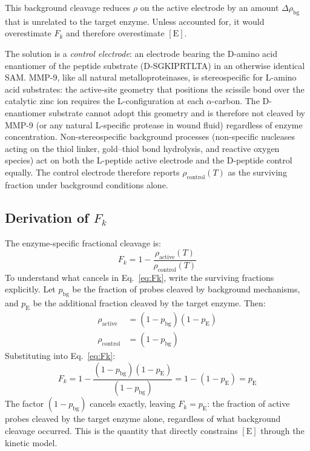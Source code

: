 \documentclass[10pt,a4paper]{article}
\numberwithin{equation}{section}
\newcommand{\Fk}{F_k}
\begin{document}
This background cleavage reduces $\rho$ on the active electrode by an
amount $\Delta\rho_\text{bg}$ that is unrelated to the target enzyme.
Unless accounted for, it would overestimate $F_k$ and therefore
overestimate $[\text{E}]$.

The solution is a \emph{control electrode}: an electrode bearing the
D-amino acid enantiomer of the peptide substrate (D-SGKIPRTLTA) in an
otherwise identical SAM. MMP-9, like all natural metalloproteinases, is
stereospecific for L-amino acid substrates: the active-site geometry that
positions the scissile bond over the catalytic zinc ion requires the
L-configuration at each $\alpha$-carbon. The D-enantiomer substrate cannot
adopt this geometry and is therefore not cleaved by MMP-9 (or any natural
L-specific protease in wound fluid) regardless of enzyme concentration.
Non-stereospecific background processes (non-specific nucleases acting on
the thiol linker, gold--thiol bond hydrolysis, and reactive oxygen species)
act on both the L-peptide active electrode and the D-peptide control equally.
The control electrode therefore reports $\rho_\text{control}(T)$ as the
surviving fraction under background conditions alone.

\subsection{Derivation of $F_k$}

The enzyme-specific fractional cleavage is:
\begin{equation}
  \boxed{
  \Fk = 1 - \frac{\rho_\text{active}(T)}{\rho_\text{control}(T)}
  }
  \label{eq:Fk}
\end{equation}
To understand what cancels in Eq.~\eqref{eq:Fk}, write the surviving fractions
explicitly. Let $p_\text{bg}$ be the fraction of probes cleaved by background
mechanisms, and $p_\text{E}$ be the additional fraction cleaved by the target
enzyme. Then:
\begin{align}
  \rho_\text{active} &= (1 - p_\text{bg})(1 - p_\text{E})
  \label{eq:rho_active}\\
  \rho_\text{control} &= (1 - p_\text{bg})
  \label{eq:rho_control}
\end{align}
Substituting into Eq.~\eqref{eq:Fk}:
\begin{equation}
  \Fk = 1 - \frac{(1-p_\text{bg})(1-p_\text{E})}{(1-p_\text{bg})}
  = 1 - (1 - p_\text{E}) = p_\text{E}
  \label{eq:Fk_simp}
\end{equation}
The factor $(1-p_\text{bg})$ cancels exactly, leaving $\Fk = p_\text{E}$:
the fraction of active probes cleaved by the target enzyme alone, regardless
of what background cleavage occurred. This is the quantity that directly
constrains $[\text{E}]$ through the kinetic model.
\end{document}
